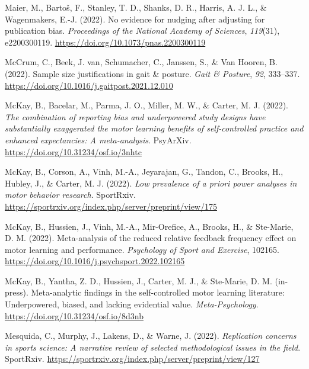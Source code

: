 \documentclass[
  man, donotrepeattitle,mask,floatsintext]{apa7}
\newlength{\cslhangindent}
\newlength{\cslentryspacingunit} %
\newenvironment{CSLReferences}[2] %
 {%
  \setlength{\parindent}{0pt}
  \ifodd #1
  \let\oldpar\par
  \def\par{\hangindent=\cslhangindent\oldpar}
  \fi
  \setlength{\parskip}{#2\cslentryspacingunit}
 }%
 {}
\begin{document}
\begin{CSLReferences}{1}{0}
\leavevmode{}%
Maier, M., Bartoš, F., Stanley, T. D., Shanks, D. R., Harris, A. J. L., \& Wagenmakers, E.-J. (2022). No evidence for nudging after adjusting for publication bias. \emph{Proceedings of the National Academy of Sciences}, \emph{119}(31), e2200300119. \url{https://doi.org/10.1073/pnas.2200300119}

\leavevmode{}%
McCrum, C., Beek, J. van, Schumacher, C., Janssen, S., \& Van Hooren, B. (2022). Sample size justifications in gait \& posture. \emph{Gait \& Posture}, \emph{92}, 333--337. \url{https://doi.org/10.1016/j.gaitpost.2021.12.010}

\leavevmode{}%
McKay, B., Bacelar, M., Parma, J. O., Miller, M. W., \& Carter, M. J. (2022). \emph{The combination of reporting bias and underpowered study designs have substantially exaggerated the motor learning benefits of self-controlled practice and enhanced expectancies: A meta-analysis}. PsyArXiv. \url{https://doi.org/10.31234/osf.io/3nhtc}

\leavevmode{}%
McKay, B., Corson, A., Vinh, M.-A., Jeyarajan, G., Tandon, C., Brooks, H., Hubley, J., \& Carter, M. J. (2022). \emph{Low prevalence of a priori power analyses in motor behavior research}. SportRxiv. \url{https://sportrxiv.org/index.php/server/preprint/view/175}

\leavevmode{}%
McKay, B., Hussien, J., Vinh, M.-A., Mir-Orefice, A., Brooks, H., \& Ste-Marie, D. M. (2022). Meta-analysis of the reduced relative feedback frequency effect on motor learning and performance. \emph{Psychology of Sport and Exercise}, 102165. \url{https://doi.org/10.1016/j.psychsport.2022.102165}

\leavevmode{}%
McKay, B., Yantha, Z. D., Hussien, J., Carter, M. J., \& Ste-Marie, D. M. (in-press). Meta-analytic findings in the self-controlled motor learning literature: Underpowered, biased, and lacking evidential value. \emph{Meta-Psychology}. \url{https://doi.org/10.31234/osf.io/8d3nb}

\leavevmode{}%
Mesquida, C., Murphy, J., Lakens, D., \& Warne, J. (2022). \emph{Replication concerns in sports science: A narrative review of selected methodological issues in the field}. SportRxiv. \url{https://sportrxiv.org/index.php/server/preprint/view/127}


\end{CSLReferences}
\end{document}
